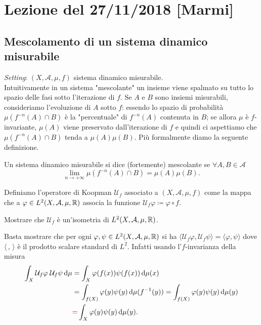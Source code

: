 \section{Lezione del 27/11/2018 [Marmi]}

\subsection{Mescolamento di un sistema dinamico misurabile}
\emph{Setting}: $ (X, \mathcal{A}, \mu, f) $ sistema dinamico misurabile. \\

Intuitivamente in un sistema "mescolante" un insieme viene spalmato su tutto lo spazio delle fasi sotto l'iterazione di $ f $. Se $ A $ e $ B $ sono insiemi misurabili, consideriamo l'evoluzione di $ A $ sotto $ f $: essendo lo spazio di probabilità $ \mu(f^{-n}(A) \cap B) $ è la "percentuale" di $ f^{-n}(A) $ contenuta in $ B $; se allora $ \mu $ è $ f $-invariante, $ \mu(A) $ viene preservato dall'iterazione di $ f $ e quindi ci aspettiamo che $ \mu(f^{-n}(A) \cap B) $ tenda a $ \mu(A) \mu(B) $. Più formalmente diamo la seguente definizione. 

\begin{definition}
    Un sistema dinamico misurabile si dice (fortemente) mescolante se $ \forall A, B \in \mathcal{A} $
    \[
        \lim_{n \to +\infty} \mu\left(f^{-n}(A) \cap B\right) = \mu(A) \mu(B).
    \]
\end{definition}

\begin{definition}
    Definiamo l'operatore di Koopman $ \mathcal{U}_f $ associato a $ (X, \mathcal{A}, \mu, f) $ come la mappa che a $ \varphi \in L^2(X, \mathcal{A}, \mu, \mathbb{R}) $ associa la funzione $ \mathcal{U}_f \varphi \coloneqq \varphi \circ f $.  
\end{definition}

\begin{exercise}
    Mostrare che $ \mathcal{U}_f $ è un'isometria di $ L^2(X, \mathcal{A}, \mu, \mathbb{R}) $.
\end{exercise}
\begin{solution}
    Basta mostrare che per ogni $ \varphi, \psi \in L^2(X, \mathcal{A}, \mu, \mathbb{R}) $ si ha $ \langle{\mathcal{U}_f \varphi, \mathcal{U}_f \psi}\rangle = \langle{\varphi, \psi}\rangle $ dove $ \langle{\, , \, }\rangle $ è il prodotto scalare standard di $ L^2 $. Infatti usando l'$ f $-invarianza della misura
   \begin{align*}
       \int_{X} \mathcal{U}_f \varphi \; \mathcal{U}_f \psi \dif{\mu} & =  \int_{X} \varphi(f(x)) \psi(f(x)) \dif{\mu}(x) \\
       & = \int_{f(X)} \varphi(y) \psi(y) \dif{\mu}(f^{-1}(y)) = \int_{f(X)} \varphi(y) \psi(y) \dif{\mu}(y) \\
       & \textcolor{red}={} \int_{X} \varphi(y) \psi(y) \dif{\mu}(y).
   \end{align*}
\end{solution}

